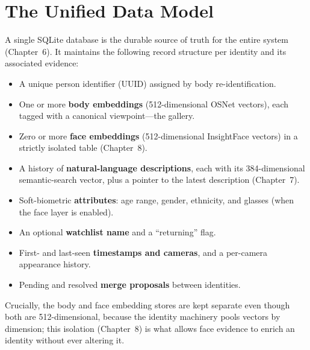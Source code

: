 \documentclass[12pt]{report}
\begin{document}
\section{The Unified Data Model}
A single SQLite database is the durable source of truth for the entire system (Chapter~6). It maintains the following record structure per identity and its associated evidence:
\begin{itemize}
    \item A unique person identifier (UUID) assigned by body re-identification.
    \item One or more \textbf{body embeddings} (512-dimensional OSNet vectors), each tagged with a canonical viewpoint---the gallery.
    \item Zero or more \textbf{face embeddings} (512-dimensional InsightFace vectors) in a strictly isolated table (Chapter~8).
    \item A history of \textbf{natural-language descriptions}, each with its 384-dimensional semantic-search vector, plus a pointer to the latest description (Chapter~7).
    \item Soft-biometric \textbf{attributes}: age range, gender, ethnicity, and glasses (when the face layer is enabled).
    \item An optional \textbf{watchlist name} and a ``returning'' flag.
    \item First- and last-seen \textbf{timestamps and cameras}, and a per-camera appearance history.
    \item Pending and resolved \textbf{merge proposals} between identities.
\end{itemize}
Crucially, the body and face embedding stores are kept separate even though both are 512-dimensional, because the identity machinery pools vectors by dimension; this isolation (Chapter~8) is what allows face evidence to enrich an identity without ever altering it.
\end{document}
